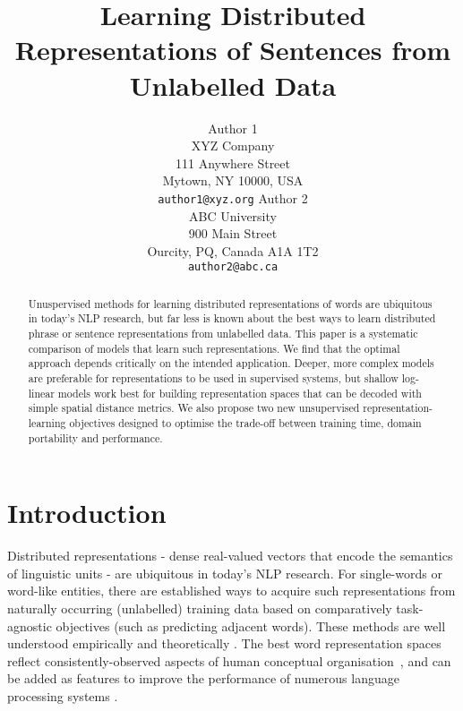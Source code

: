 \documentclass[11pt,letterpaper]{article}
\title{Learning Distributed Representations of Sentences from Unlabelled Data}
\author{Author 1\\
	    XYZ Company\\
	    111 Anywhere Street\\
	    Mytown, NY 10000, USA\\
	    {\tt author1@xyz.org}
	  \And
	Author 2\\
  	ABC University\\
  	900 Main Street\\
  	Ourcity, PQ, Canada A1A 1T2\\
  {\tt author2@abc.ca}}
\date{}
\begin{document}
\maketitle

\begin{abstract}
Unuspervised methods for learning distributed representations of words are ubiquitous in today's NLP research, but far less is known about the best ways to learn distributed phrase or sentence representations from unlabelled data. This paper is a systematic comparison of models that learn such representations. We find that the optimal approach depends critically on the intended application. Deeper, more complex models are preferable for representations to be used in supervised systems, but shallow log-linear models work best for building representation spaces that can be decoded with simple spatial distance metrics. We also propose two new unsupervised representation-learning objectives designed to optimise the trade-off between training time, domain portability and performance. 
  
\end{abstract}

\section{Introduction}

Distributed representations - dense real-valued vectors that encode the semantics of linguistic units - are ubiquitous in today's NLP research. For single-words or word-like entities, there are established ways to acquire such representations from naturally occurring (unlabelled) training data based on comparatively task-agnostic objectives (such as predicting adjacent words). These methods are well understood empirically \cite{baroni2014don} and theoretically \cite{levy2014neural}. The best word representation spaces reflect consistently-observed aspects of human conceptual organisation~\cite{hill2014simlex}, and can be added as features to improve the performance of numerous language processing systems \cite{collobert2011natural}. 
\end{document}
